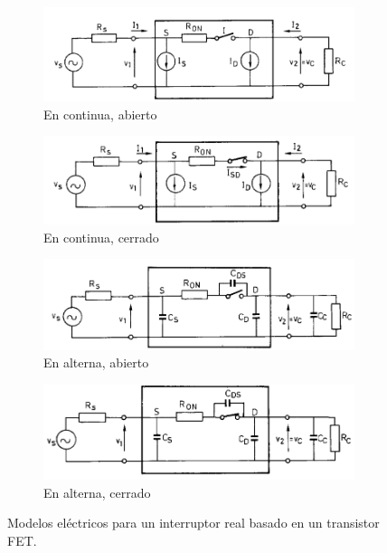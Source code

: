 \begin{figure}[H]
    \centering
    \begin{subfigure}[c]{0.45\textwidth}
        \centering
        \includegraphics[width=\textwidth]{Imagenes/FET - Continua - Abierto.png}
        \caption{En continua, abierto}
    \end{subfigure}
    \begin{subfigure}[c]{0.45\textwidth}
        \centering
        \includegraphics[width=\textwidth]{Imagenes/FET - Continua - Cerrado.png}
        \caption{En continua, cerrado}
    \end{subfigure}
    \begin{subfigure}[c]{0.45\textwidth}
        \centering
        \includegraphics[width=\textwidth]{Imagenes/FET - Alterna - Abierto.png}
        \caption{En alterna, abierto}
    \end{subfigure}
    \begin{subfigure}[c]{0.45\textwidth}
        \centering
        \includegraphics[width=\textwidth]{Imagenes/FET - Alterna - Cerrado.png}
        \caption{En alterna, cerrado}
    \end{subfigure}
    \caption{Modelos eléctricos para un interruptor real basado en un transistor FET.}
    \label{fig:Interruptor Real}
\end{figure}

